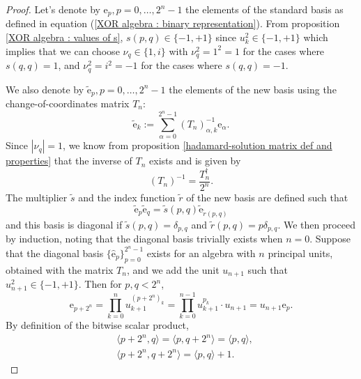 \documentclass[10pt,a4paper]{amsart}
\begin{document}
\begin{proof}
    Let's denote by $\mathrm e_p, p=0,\ldots,2^n-1$ the elements of the standard basis as defined in equation (\ref{XOR algebra : binary representation}). From proposition \ref{XOR algebra : values of s}, $s(p,q) \in \{ -1, +1 \}$ since $u_k^2 \in \{ -1, +1 \}$ which implies that we can choose $\nu_q \in \{ 1,i \}$ with $\nu_q^2 = 1^2 = 1$ for the cases where $s(q,q) = 1$, and $\nu_q^2 = i^2 = -1$ for the cases where $s(q,q)=-1$. 
    
    
    We also denote by $\tilde{\mathrm{e}}_p, p=0,\ldots,2^n-1$ the elements of the new basis using the change-of-coordinates matrix $T_n$:
    $$ \tilde{\mathrm e}_k := \sum_{\alpha=0}^{2^n-1} (T_n)^{-1}_{\alpha,k} \mathrm e_\alpha. $$
    Since $|\nu_q| = 1$, we know from proposition \ref{hadamard-solution matrix def and properties} that the inverse of $T_n$ exists and is given by
    $$ (T_n)^{-1} = \frac{T_n^{\dagger}}{2^n}. $$
    The multiplier $\tilde{s}$ and the index function $\tilde{r}$ of the new basis are defined such that
    $$ \tilde{\mathrm e}_p \tilde{\mathrm e}_q = \tilde s(p,q) \tilde{\mathrm e}_{\tilde r(p,q)} $$
    and this basis is diagonal if $\tilde{s}(p,q) = \delta_{p,q}$ and $\tilde{r}(p,q) = p \delta_{p,q}$. We then proceed by induction, noting that the diagonal basis trivially exists when $n=0$. Suppose that the diagonal basis $\{ \hat{\mathrm e}_p \}_{p=0}^{2^n-1}$ exists for an algebra with $n$ principal units, obtained with the matrix $T_n$, and we add the unit $u_{n+1}$ such that $u_{n+1}^2 \in \{ -1, +1 \}$. Then for $p,q < 2^n$,
    \begin{equation}
        \label{multiperplex and multicomplex diagonal basis theorem : elements e}
        \mathrm e_{p+2^n} = \prod_{k=0}^{n} u_{k+1}^{(p+2^n)_k} = \prod_{k=0}^{n-1} u_{k+1}^{p_k} \cdot u_{n+1} = u_{n+1} \mathrm e_p.
    \end{equation}
    By definition of the bitwise scalar product,
    \begin{equation}
        \label{multiperplex and multicomplex diagonal basis theorem : bitwise scalar product}
        \begin{aligned}
            & \langle p + 2^n,q\rangle = \langle p,q + 2^n\rangle =  \langle p,q\rangle,\\
            & \langle p + 2^n,q + 2^n\rangle = \langle p,q\rangle + 1.

\end{aligned}
\end{equation}
\end{proof}
\end{document}
